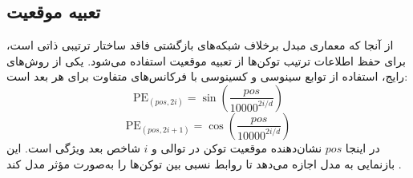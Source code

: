 \subsection{تعبیه موقعیت}
از آنجا که معماری مبدل برخلاف شبکه‌های بازگشتی فاقد ساختار ترتیبی ذاتی است، برای حفظ اطلاعات ترتیب توکن‌ها از تعبیه موقعیت استفاده می‌شود. یکی از روش‌های رایج، استفاده از توابع سینوسی و کسینوسی با فرکانس‌های متفاوت برای هر بعد است:
\begin{equation}
    \text{PE}_{(pos, 2i)} = \sin\left(\frac{pos}{10000^{2i/d}}\right)
\end{equation}
\begin{equation}
    \text{PE}_{(pos, 2i+1)} = \cos\left(\frac{pos}{10000^{2i/d}}\right)
\end{equation}
در اینجا $pos$ نشان‌دهنده موقعیت توکن در توالی و $i$ شاخص بعد ویژگی است. این بازنمایی به مدل اجازه می‌دهد تا روابط نسبی بین توکن‌ها را به‌صورت مؤثر مدل کند \cite{Vaswani2017}.

